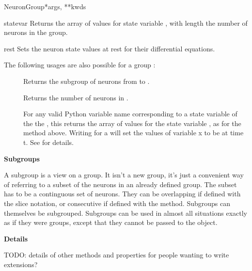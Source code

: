 \documentclass[letterpaper,10pt,english]{manual}
\begin{document}
\begin{classdesc}{NeuronGroup}{*args, **kwds}
\hypertarget{brian.NeuronGroup.state}{}\begin{methoddesc}{state}{var}
Returns the array of values for state
variable , with length the number of neurons in the
group.
\end{methoddesc}

\hypertarget{brian.NeuronGroup.rest}{}\begin{methoddesc}{rest}{}
Sets the neuron state values at rest for their differential
equations.
\end{methoddesc}

The following usages are also possible for a group :
\begin{description}
\item[] \leavevmode
Returns the subgroup of neurons from  to .

\item[] \leavevmode
Returns the number of neurons in .

\item[] \leavevmode
For any valid Python variable name  corresponding to
a state variable of the the \hyperlink{brian.NeuronGroup}{}, this
returns the array of values for the state
variable , as for the \hyperlink{brian.NeuronGroup.state}{} method
above. Writing  for  a \hyperlink{brian.TimedArray}{}
will set the values of variable x to be  at time t.
See \hyperlink{brian.TimedArraySetter}{} for details.

\end{description}

\textbf{Subgroups}

A subgroup is a view on a group. It isn't a new group, it's just
a convenient way of referring to a subset of the neurons in an
already defined group. The subset has to be a continguous set of
neurons. They can be overlapping if defined with the slice
notation, or consecutive if defined with the \hyperlink{brian.NeuronGroup.subgroup}{} method.
Subgroups can themselves be subgrouped. Subgroups can be used in
almost all situations exactly as if they were groups, except that
they cannot be passed to the \hyperlink{brian.Network}{} object.

\textbf{Details}

TODO: details of other methods and properties for people
wanting to write extensions?
\end{classdesc}
\end{document}
